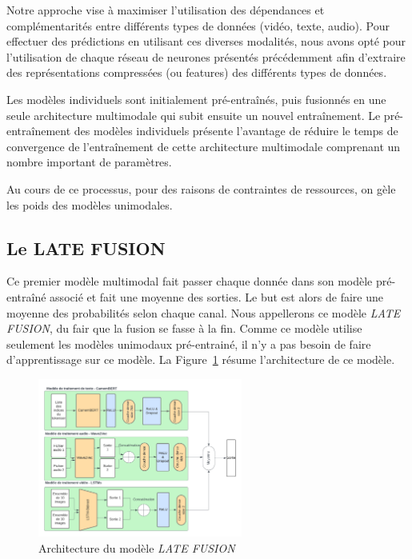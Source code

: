 Notre approche vise à maximiser l'utilisation des dépendances et complémentarités entre différents types de données (vidéo, texte,
audio). Pour effectuer des prédictions en utilisant ces diverses modalités, nous avons opté pour l'utilisation de chaque réseau de
neurones présentés précédemment afin d'extraire des représentations compressées (ou features) des différents types de données. 

Les modèles individuels sont initialement pré-entraînés, puis fusionnés en une seule architecture multimodale qui subit ensuite un
nouvel entraînement. Le pré-entraînement des modèles individuels présente l'avantage de réduire le temps de convergence de
l'entraînement de cette architecture multimodale comprenant un nombre important de paramètres.

Au cours de ce processus, pour des raisons de contraintes de ressources, on gèle les poids des modèles unimodales.

\subsection{Le LATE FUSION}
Ce premier modèle multimodal fait passer chaque donnée dans son modèle pré-entraîné associé et fait une moyenne des sorties. Le but
est alors de faire une moyenne des probabilités selon chaque canal. Nous appellerons ce modèle \textit{LATE FUSION}, du fair que la 
fusion se fasse à la fin. Comme ce modèle utilise seulement les modèles unimodaux pré-entrainé, il n'y a pas besoin de faire 
d'apprentissage sur ce modèle.
La Figure~\ref{fig: LATE FUSION} résume l'architecture de ce modèle.

\begin{figure}[H]
    \centering
    \includegraphics[width=0.6\textwidth]{image_model/late_fusion.png}
    \caption{Architecture du modèle \textit{LATE FUSION}}
    \label{fig: LATE FUSION}
\end{figure}

